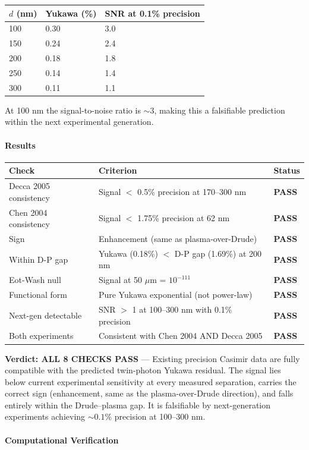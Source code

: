 \documentclass[
  11pt,
]{article}
\begin{document}
\begin{longtable}[]{@{}lll@{}}
\toprule
\(d\) (nm) & Yukawa (\%) & SNR at 0.1\% precision\tabularnewline
\midrule
\endhead
100 & 0.30 & 3.0\tabularnewline
150 & 0.24 & 2.4\tabularnewline
200 & 0.18 & 1.8\tabularnewline
250 & 0.14 & 1.4\tabularnewline
300 & 0.11 & 1.1\tabularnewline
\bottomrule
\end{longtable}

At 100 nm the signal-to-noise ratio is \(\sim 3\), making this a
falsifiable prediction within the next experimental generation.

\bigskip

\hypertarget{results-12}{%
\paragraph{Results}\label{results-12}}

\begin{longtable}[]{@{}lll@{}}
\toprule
Check & Criterion & Status\tabularnewline
\midrule
\endhead
Decca 2005 consistency & Signal \(<\) 0.5\% precision at 170--300 nm &
\textbf{PASS}\tabularnewline
Chen 2004 consistency & Signal \(<\) 1.75\% precision at 62 nm &
\textbf{PASS}\tabularnewline
Sign & Enhancement (same as plasma-over-Drude) &
\textbf{PASS}\tabularnewline
Within D-P gap & Yukawa (0.18\%) \(<\) D-P gap (1.69\%) at 200 nm &
\textbf{PASS}\tabularnewline
Eot-Wash null & Signal at 50 \(\mu\)m = \(10^{-111}\) &
\textbf{PASS}\tabularnewline
Functional form & Pure Yukawa exponential (not power-law) &
\textbf{PASS}\tabularnewline
Next-gen detectable & SNR \(>\) 1 at 100--300 nm with 0.1\% precision &
\textbf{PASS}\tabularnewline
Both experiments & Consistent with Chen 2004 AND Decca 2005 &
\textbf{PASS}\tabularnewline
\bottomrule
\end{longtable}

\textbf{Verdict: ALL 8 CHECKS PASS} --- Existing precision Casimir data
are fully compatible with the predicted twin-photon Yukawa residual. The
signal lies below current experimental sensitivity at every measured
separation, carries the correct sign (enhancement, same as the
plasma-over-Drude direction), and falls entirely within the
Drude--plasma gap. It is falsifiable by next-generation experiments
achieving \(\sim 0.1\%\) precision at 100--300 nm.

\bigskip

\hypertarget{computational-verification-3}{%
\paragraph{Computational
Verification}\label{computational-verification-3}}
\end{document}
